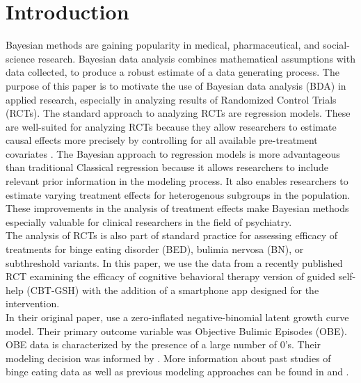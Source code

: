 \documentclass{article}
\begin{document}
\section{Introduction}
Bayesian methods are gaining popularity in medical, pharmaceutical, and social-science research. Bayesian data analysis combines mathematical assumptions with data collected, to produce a robust estimate of a data generating process. The purpose of this paper is to motivate the use of Bayesian data analysis (BDA) in applied research, especially in analyzing results of Randomized Control Trials (RCTs). The standard approach to analyzing RCTs are regression models. These are well-suited for analyzing RCTs because they allow researchers to estimate causal effects more precisely by controlling for all available pre-treatment covariates \cite{gelman2006data}. The Bayesian approach to regression models is more advantageous than traditional  Classical regression because it allows researchers to include relevant prior information in the modeling process. It also enables researchers to estimate varying treatment effects for heterogenous subgroups in the population. These improvements in the analysis of treatment effects make Bayesian methods especially valuable for clinical researchers in the field of psychiatry.\\
The analysis of RCTs is also part of standard practice for assessing efficacy of treatments for binge eating disorder (BED), bulimia nervosa (BN), or subthreshold variants. In this paper, we use the data from a recently published RCT examining the efficacy of cognitive behavioral therapy version of guided self-help (CBT-GSH) with the addition of a smartphone app designed for the intervention. \\
In their original paper,  use a zero-inflated negative-binomial latent growth curve model. Their primary outcome variable was Objective Bulimic Episodes (OBE). OBE data is characterized by the presence of a large number of 0's. Their modeling decision was informed by . More information about past studies of binge eating data as well as previous modeling approaches can be found in  and . \\
\end{document}
